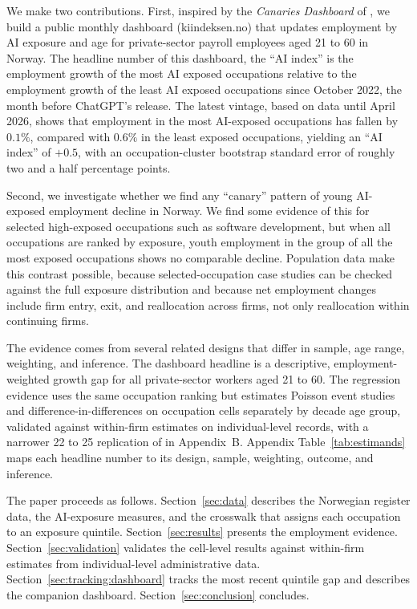 \documentclass[12pt]{article}
\begin{document}
We make two contributions. 
First, inspired by the \emph{Canaries Dashboard} of \citet{stanford-indicators-canaries}, we build a public monthly dashboard (kiindeksen.no) that updates employment by AI exposure and age for private-sector payroll employees aged 21 to 60 in Norway. The headline number of this dashboard, the ``AI index'' is the employment growth of the most AI exposed occupations relative to the employment growth of the least AI exposed occupations since October 2022, the month before ChatGPT's release. The latest vintage, based on data until April 2026, shows that employment in the most AI-exposed occupations has fallen by $0.1\%$, compared with $0.6\%$ in the least exposed occupations, yielding an ``AI index'' of $+0.5$, with an occupation-cluster bootstrap standard error of roughly two and a half percentage points.

Second, we investigate whether we find any ``canary'' pattern of young AI-exposed employment decline in Norway. We find some evidence of this for selected high-exposed occupations such as software development, but when all occupations are ranked by exposure, youth employment in the group of all the most exposed occupations shows no comparable decline. Population data make this contrast possible, because selected-occupation case studies can be checked against the full exposure distribution and because net employment changes include firm entry, exit, and reallocation across firms, not only reallocation within continuing firms. 


The evidence comes from several related designs that differ in sample, age range, weighting, and inference. The dashboard headline is a descriptive, employment-weighted growth gap for all private-sector workers aged 21 to 60. The regression evidence uses the same occupation ranking but estimates Poisson event studies and difference-in-differences on occupation cells separately by decade age group, validated against within-firm estimates on individual-level records, with a narrower 22 to 25 replication of \citet{brynjolfsson2025} in Appendix~B. Appendix Table~\ref{tab:estimands} maps each headline number to its design, sample, weighting, outcome, and inference.

The paper proceeds as follows. Section~\ref{sec:data} describes the Norwegian register data, the AI-exposure measures, and the crosswalk that assigns each occupation to an exposure quintile. Section~\ref{sec:results} presents the employment evidence. Section~\ref{sec:validation} validates the cell-level results against within-firm estimates from individual-level administrative data. Section~\ref{sec:tracking:dashboard} tracks the most recent quintile gap and describes the companion dashboard. Section~\ref{sec:conclusion} concludes.
\end{document}
